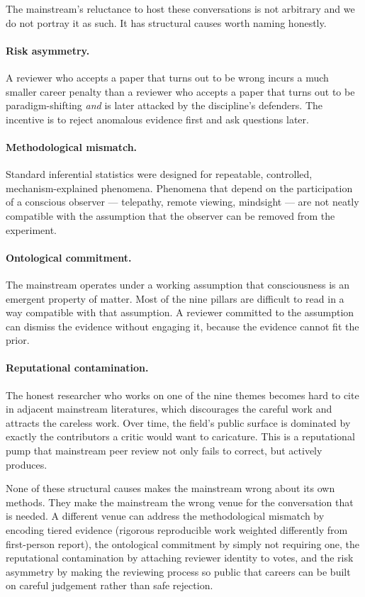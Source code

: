 \documentclass[11pt,a4paper]{article}
\begin{document}
The mainstream's reluctance to host these conversations is not
arbitrary and we do not portray it as such. It has structural
causes worth naming honestly.

\paragraph{Risk asymmetry.} A reviewer who accepts a paper that
turns out to be wrong incurs a much smaller career penalty than a
reviewer who accepts a paper that turns out to be paradigm-shifting
\emph{and} is later attacked by the discipline's defenders. The
incentive is to reject anomalous evidence first and ask questions
later.

\paragraph{Methodological mismatch.} Standard inferential statistics
were designed for repeatable, controlled, mechanism-explained
phenomena. Phenomena that depend on the participation of a
conscious observer --- telepathy, remote viewing, mindsight --- are
not neatly compatible with the assumption that the observer can be
removed from the experiment.

\paragraph{Ontological commitment.} The mainstream operates under a
working assumption that consciousness is an emergent property of
matter. Most of the nine pillars are difficult to read in a way
compatible with that assumption. A reviewer committed to the
assumption can dismiss the evidence without engaging it, because
the evidence cannot fit the prior.

\paragraph{Reputational contamination.} The honest researcher who
works on one of the nine themes becomes hard to cite in adjacent
mainstream literatures, which discourages the careful work and
attracts the careless work. Over time, the field's public surface
is dominated by exactly the contributors a critic would want to
caricature. This is a reputational pump that mainstream peer review
not only fails to correct, but actively produces.

None of these structural causes makes the mainstream wrong about
its own methods. They make the mainstream the wrong venue for the
conversation that is needed. A different venue can address the
methodological mismatch by encoding tiered evidence (rigorous
reproducible work weighted differently from first-person report),
the ontological commitment by simply not requiring one, the
reputational contamination by attaching reviewer identity to votes,
and the risk asymmetry by making the reviewing process so public
that careers can be built on careful judgement rather than safe
rejection.
\end{document}
